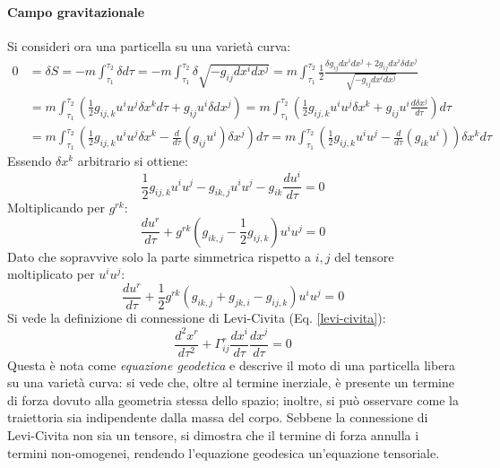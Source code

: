 \paragraph{Campo gravitazionale}

Si consideri ora una particella su una varietà curva:
\begin{equation*}
	\begin{split}
		0
		&= \delta S = -m \int_{\tau_1}^{\tau_2} \delta d\tau = -m \int_{\tau_1}^{\tau_2} \delta \sqrt{- g_{ij} dx^i dx^j} = m \int_{\tau_1}^{\tau_2} \frac{1}{2} \frac{\delta g_{ij} dx^i dx^j + 2g_{ij} dx^i \delta dx^j}{\sqrt{- g_{ij} dx^i dx^j}}\\
		&= m \int_{\tau_1}^{\tau_2} \left( \frac{1}{2} g_{ij,k} u^i u^j \delta x^k d\tau + g_{ij} u^i \delta dx^j \right) = m \int_{\tau_1}^{\tau_2} \left( \frac{1}{2} g_{ij,k} u^i u^j \delta x^k + g_{ij} u^i \frac{d\delta x^j}{d\tau} \right) d\tau\\
		&= m \int_{\tau_1}^{\tau_2} \left( \frac{1}{2} g_{ij,k} u^i u^j \delta x^k - \frac{d}{d\tau} \left( g_{ij} u^i \right) \delta x^j \right) d\tau = m \int_{\tau_1}^{\tau_2} \left( \frac{1}{2} g_{ij,k} u^i u^j - \frac{d}{d\tau} \left( g_{ik} u^i \right) \right) \delta x^k d\tau
	\end{split}
\end{equation*}
Essendo $ \delta x^k $ arbitrario si ottiene:
\begin{equation}
	\frac{1}{2} g_{ij,k} u^i u^j - g_{ik,j} u^i u^j - g_{ik} \frac{du^i}{d\tau} = 0
	\label{eq:5.9}
\end{equation}
Moltiplicando per $ g^{rk} $:
\begin{equation}
	\frac{du^r}{d\tau} + g^{rk} \left( g_{ik,j} - \frac{1}{2} g_{ij,k} \right) u^i u^j = 0
	\label{eq:5.10}
\end{equation}
Dato che sopravvive solo la parte simmetrica rispetto a $ i,j $ del tensore moltiplicato per $ u^i u^j $:
\begin{equation}
	\frac{du^r}{d\tau} + \frac{1}{2} g^{rk} \left( g_{ik,j} + g_{jk,i} - g_{ij,k} \right) u^i u^j = 0
	\label{eq:5.11}
\end{equation}
Si vede la definizione di connessione di Levi-Civita (Eq. \ref{levi-civita}):
\begin{equation}
	\frac{d^2 x^r}{d\tau^2} + \Gamma^r_{ij} \frac{dx^i}{d\tau} \frac{dx^j}{d\tau} = 0
	\label{eq:5.12}
\end{equation}
Questa è nota come \textit{equazione geodetica} e descrive il moto di una particella libera su una varietà curva: si vede che, oltre al termine inerziale, è presente un termine di forza dovuto alla geometria stessa dello spazio; inoltre, si può osservare come la traiettoria sia indipendente dalla massa del corpo.
Sebbene la connessione di Levi-Civita non sia un tensore, si dimostra che il termine di forza annulla i termini non-omogenei, rendendo l'equazione geodesica un'equazione tensoriale.

